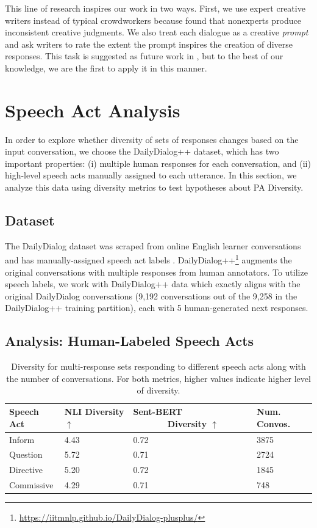 \documentclass[11pt]{article}
\newcommand{\edivshort}{PA Diversity}
\begin{document}
This line of research inspires our work in two ways.  First, we use  expert creative writers instead of typical crowdworkers because 
\citet{kaufman} found that nonexperts produce inconsistent creative judgments.  
We also treat each dialogue as a creative \textit{prompt} and ask writers to rate the extent the prompt inspires the creation of diverse responses.  This task is suggested as future work  in \citet{baer}, but to the best of our knowledge, we are the first to apply it in this manner. 


\section{Speech Act Analysis}\label{sec:coarse}
In order to explore whether diversity of sets of responses changes based on the input conversation, we choose the DailyDialog++ dataset, which has two important properties: (i) multiple  human responses for each conversation, and (ii)  high-level speech acts manually assigned to each utterance.  In this section, we  analyze this data using diversity metrics to test hypotheses about \edivshort.



\subsection{Dataset}
The  DailyDialog dataset was scraped from online English learner conversations  and has manually-assigned speech act labels \cite{li-etal-2017-dailydialog}.  DailyDialog++\footnote{\url{https://iitmnlp.github.io/DailyDialog-plusplus/}} augments the original conversations with multiple responses from human annotators.  
 To utilize speech labels, we work with DailyDialog++ data which exactly aligns with the original DailyDialog conversations (9,192 conversations out of the 9,258 in the DailyDialog++ training partition), each with 5 human-generated next responses.

\subsection{Analysis: Human-Labeled Speech Acts}
\begin{table}[]
    \centering
    \small
    \begin{tabular}{|p{1.9cm}|p{1.5cm}|p{1.7cm}|p{0.9cm}|}
      \hline
      \rule{0pt}{1em}\textbf{Speech Act}  &  \textbf{NLI Diversity} 	$\uparrow$ & \textbf{Sent-BERT ~~~~~~~Diversity} 	$\uparrow$ & \textbf{Num. Convos.} \\\hline
        Inform & 4.43 & 0.72 & 3875 \\ 
        Question & 5.72 & 0.71 & 2724\\
        Directive & 5.20 & 0.72 & 1845\\
        Commissive & 4.29 & 0.71 & 748 \\\hline
    \end{tabular}
    \caption{Diversity for multi-response sets responding to different speech acts along with the number of conversations.   
    For both metrics, higher values indicate higher level of diversity.}
    \label{tab:coarse_div}
\end{table}
\end{document}
